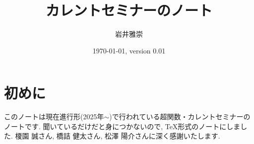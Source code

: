 \documentclass[dvipdfmx,a4paper,11pt]{report} %
\title{カレントセミナーのノート}
\author{岩井雅崇}
\date{\today, version 0.01}
\theoremstyle{definition}
\theoremstyle{remark}
\numberwithin{equation}{section}
\begin{document}
\maketitle
\tableofcontents %

\chapter*{初めに}
このノートは現在進行形(2025年$\sim$)で行われている超関数・カレントセミナーのノートです.
聞いているだけだと身につかないので, TeX形式のノートにしました. 
榎園 誠さん, 橋詰 健太さん, 松澤 陽介さんに深く感謝いたします. 



\end{document}
